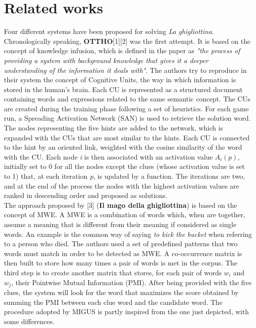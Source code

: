 \documentclass[twoside,twocolumn]{article}
\begin{document}
\section{Related works}
Four different systems have been proposed for solving \textit{La ghigliottina}. Chronologically speaking, \textbf{OTTHO}[1][2] was the first attempt. It is based on the concept of knowledge infusion, which is defined in the paper as \textit{"the process of providing a system with background knowledge that gives it a deeper understanding of the information it deals with"}. The authors try to reproduce in their system the concept of Cognitive Units, the way in which information is stored in the human's brain. Each CU is represented as a structured document containing words and expressions related to the same semantic concept. The CUs are created during the training phase following a set of heuristics. For each game run, a Spreading Activation Network (SAN) is used to retrieve the solution word. The nodes representing the five hints are added to the network, which is expanded with the CUs that are most similar to the hints. Each CU is connected to the hint by an oriented link, weighted with the cosine similarity of the word with the CU. Each node \textit{i} is then associated with an activation value \textit{$A_i (p)$}, initially set to 0 for all the nodes except the clues (whose activation value is set to 1) that, at each iteration \textit{p}, is updated by a function. The iterations are two, and at the end of the process the nodes with the highest activation values are ranked in descending order and proposed as solutions. \\
The approach proposed by [3] (\textbf{Il mago della ghigliottina}) is based on the concept of MWE. A MWE is a combination of words which, when are together, assume a meaning that is different from their meaning if considered as single words. An example is the common way of saying \textit{to kick the bucket} when referring to a person who died. The authors used a set of predefined patterns that two words must match in order to be detected as MWE. A co-occurrence matrix is then built to store how many times a pair of words is met in the corpus. The third step is to create another matrix that stores, for each pair of words $w_i$ and $w_j$, their Pointwise Mutual Information (PMI). After being provided with the five clues, the system will look for the word that maximizes the score obtained by summing the PMI between each clue word and the candidate word. The procedure adopted by MIGUS is partly inspired from the one just depicted, with some differences. \\
\end{document}
